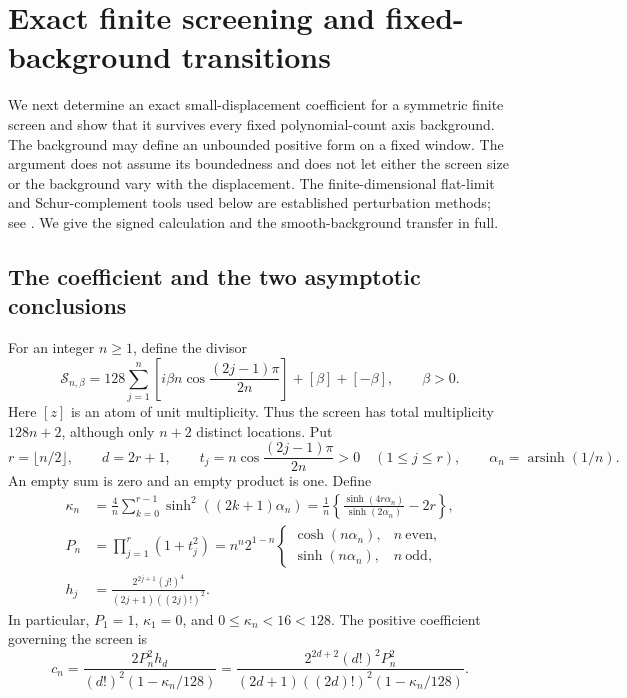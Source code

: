 \section{Exact finite screening and fixed-background transitions}
\label{sec:screening}

We next determine an exact small-displacement coefficient for a symmetric
finite screen and show that it survives every fixed polynomial-count axis
background. The background may define an unbounded positive form on a
fixed window. The argument does not assume its boundedness and does not
let either the screen size or the background vary with the displacement.
The finite-dimensional flat-limit and Schur-complement tools used below
are established perturbation methods; see \cite{UsevichBarthelme}.
We give the signed calculation and the smooth-background transfer in full.

\subsection{The coefficient and the two asymptotic conclusions}

For an integer \(n\ge1\), define the divisor
\begin{equation}\label{scr:screen-definition}
 \mathcal S_{n,\beta}
 =128\sum_{j=1}^n
   \left[i\beta n\cos\frac{(2j-1)\pi}{2n}\right]
       +[\beta]+[-\beta],
 \qquad \beta>0.
\end{equation}
Here \([z]\) is an atom of unit multiplicity. Thus the screen has total
multiplicity \(128n+2\), although only \(n+2\) distinct locations.
Put
\begin{equation}\label{scr:parameters}
 r=\lfloor n/2\rfloor,\qquad d=2r+1,\qquad
 t_j=n\cos\frac{(2j-1)\pi}{2n}>0\quad(1\le j\le r),
 \qquad \alpha_n=\operatorname{arsinh}(1/n).
\end{equation}
An empty sum is zero and an empty product is one. Define
\begin{align}
 \kappa_n
 &=\frac4n\sum_{k=0}^{r-1}
              \sinh^2((2k+1)\alpha_n)
   =\frac1n\left\{
       \frac{\sinh(4r\alpha_n)}{\sinh(2\alpha_n)}-2r
            \right\},                                      \label{scr:kappa}\\
 P_n
 &=\prod_{j=1}^r(1+t_j^2)
   =n^n2^{1-n}
       \begin{cases}
        \cosh(n\alpha_n),&n\ \text{even},\\
        \sinh(n\alpha_n),&n\ \text{odd},
       \end{cases}                                         \label{scr:product}\\
 h_j
 &=\frac{2^{2j+1}(j!)^4}{(2j+1)((2j)!)^2}.                 \label{scr:legendre-norm}
\end{align}
In particular, \(P_1=1\), \(\kappa_1=0\), and
\(0\le\kappa_n<16<128\). The positive coefficient governing the
screen is
\begin{equation}\label{scr:coefficient}
 c_n=\frac{2P_n^2h_d}{(d!)^2(1-\kappa_n/128)}
     =\frac{2^{2d+2}(d!)^2P_n^2}
       {(2d+1)((2d)!)^2(1-\kappa_n/128)}.
\end{equation}

